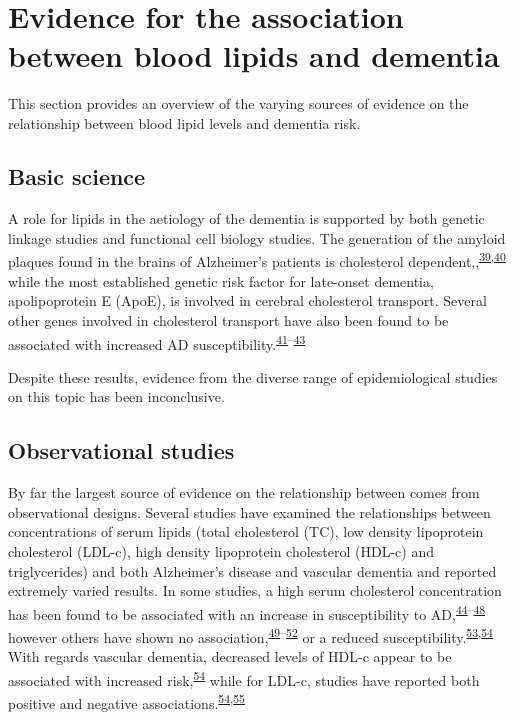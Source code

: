 \documentclass[a4paper, twoside]{templates/ociamthesis}
\begin{document}
~

\hypertarget{evidence-association}{%
\section{Evidence for the association between blood lipids and dementia}\label{evidence-association}}

This section provides an overview of the varying sources of evidence on the relationship between blood lipid levels and dementia risk.

\hypertarget{intro-basic-science}{%
\subsection{Basic science}\label{intro-basic-science}}

A role for lipids in the aetiology of the dementia is supported by both genetic linkage studies and functional cell biology studies. The generation of the amyloid plaques found in the brains of Alzheimer's patients is cholesterol dependent,,\textsuperscript{\protect\hyperlink{ref-burns2003}{39},\protect\hyperlink{ref-mizuno1999}{40}} while the most established genetic risk factor for late-onset dementia, apolipoprotein E (ApoE), is involved in cerebral cholesterol transport. Several other genes involved in cholesterol transport have also been found to be associated with increased AD susceptibility.\textsuperscript{\protect\hyperlink{ref-beecham2014}{41}--\protect\hyperlink{ref-meng2007}{43}}

Despite these results, evidence from the diverse range of epidemiological studies on this topic has been inconclusive.

\hypertarget{observational-studies}{%
\subsection{Observational studies}\label{observational-studies}}

By far the largest source of evidence on the relationship between comes from observational designs. Several studies have examined the relationships between concentrations of serum lipids (total cholesterol (TC), low density lipoprotein cholesterol (LDL-c), high density lipoprotein cholesterol (HDL-c) and triglycerides) and both Alzheimer's disease and vascular dementia and reported extremely varied results. In some studies, a high serum cholesterol concentration has been found to be associated with an increase in susceptibility to AD,\textsuperscript{\protect\hyperlink{ref-kivipelto2002}{44}--\protect\hyperlink{ref-whitmer2005}{48}} however others have shown no association,\textsuperscript{\protect\hyperlink{ref-li2005a}{49}--\protect\hyperlink{ref-tan2003a}{52}} or a reduced susceptibility.\textsuperscript{\protect\hyperlink{ref-mielke2005}{53},\protect\hyperlink{ref-reitz2004a}{54}} With regards vascular dementia, decreased levels of HDL-c appear to be associated with increased risk,\textsuperscript{\protect\hyperlink{ref-reitz2004a}{54}} while for LDL-c, studies have reported both positive and negative associations.\textsuperscript{\protect\hyperlink{ref-reitz2004a}{54},\protect\hyperlink{ref-moroney1999}{55}}
\end{document}
